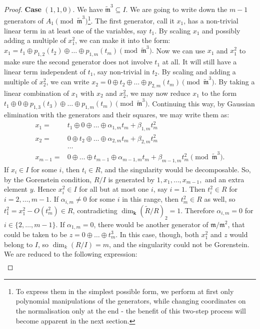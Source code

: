 \documentclass{compositio}
\renewcommand{\k}{\mathbf k}
\newcommand{\m}{\mathfrak m}
\newcommand{\tR}{\widetilde{R}}
\newcommand{\tm}{\widetilde{\mathfrak m}}
\theoremstyle{plain}
\theoremstyle{definition}
\theoremstyle{remark}
\begin{document}
\begin{proof}
 \textbf{Case} $(1,1,0)$. We have $\tm^3\subseteq I$. We are going to write down the $m-1$ generators of $A_1 \pmod {\tm^3}$\footnote{To express them in the simplest possible form, we perform at first only polynomial manipulations of the generators, while changing coordinates on the normalisation only at the end - the benefit of this two-step process will become apparent in the next section.}. The first generator, call it $x_1$, has a non-trivial linear term in at least one of the variables, say $t_1$. By scaling $x_1$ and possibly adding a multiple of $x_1^2$, we can make it into the form:
 $x_1=t_1\oplus p_{1,2}(t_2)\oplus\ldots\oplus p_{1,m}(t_m) \pmod{\tm^3}.$ Now we can use $x_1$ and $x_1^2$ to make sure the second generator does not involve $t_1$ at all. It will still have a linear term independent of $t_1$, say non-trivial in $t_2$. By scaling and adding a multiple of $x_2^2$, we can write $x_2=0\oplus t_2\oplus\ldots\oplus p_{2,m}(t_m) \pmod{\tm^3}.$ By taking a linear combination of $x_1$ with $x_2$ and $x_2^2$, we may now reduce $x_1$ to the form $t_1\oplus0\oplus p_{1,3}(t_3)\oplus\ldots\oplus p_{1,m}(t_m)\pmod{\tm^3}$. Continuing this way, by Gaussian elimination with the generators and their squares, we may write them as:
 \begin{align*}
  x_1= & t_1\oplus0\oplus\ldots\oplus\alpha_{1,m}t_m+\beta_{1,m}t_m^2\\
  x_2= & 0\oplus t_2\oplus\ldots\oplus\alpha_{2,m}t_m+\beta_{2,m}t_m^2\\
  &\ldots\\
  x_{m-1}= & 0\oplus\ldots\oplus t_{m-1}\oplus\alpha_{m-1,m}t_m+\beta_{m-1,m}t_m^2 \pmod{\tm^3}.
 \end{align*}
 If $x_i\in I$ for some $i$, then $t_i\in R$, and the singularity would be decomposable. So, by the Gorenstein condition, $R/I$ is generated by $1,x_1,\ldots,x_{m-1},$ and an extra element $y$. Hence $x_i^2\in I$ for all but at most one $i$, say $i=1$. Then $t_i^2\in R$ for $i=2,\ldots,m-1$. If $\alpha_{i,m}\neq 0$ for some $i$ in this range, then $t_m^2\in R$ as well, so $t_1^2=x_1^2-O(t_m^2)\in R$, contradicting $\dim_\k(\tR/R)_2=1$. Therefore $\alpha_{i,m}=0$ for $i\in\{2,\ldots,m-1\}$. If $\alpha_{1,m}=0$, there would be another generator of $\m/\m^2$, that could be taken to be $z=0\oplus\ldots\oplus t_m^3$. In this case, though, both $x_1^2$ and $z$ would belong to $I$, so $\dim_k(R/I)=m$, and the singularity could not be Gorenstein. We are reduced to the following expression:
 \begin{align}\label{coordII-cs}

\end{align}
\end{proof}
\end{document}

